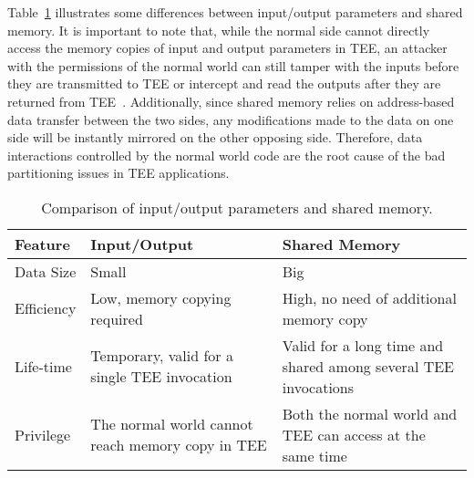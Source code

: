 Table~\ref{tbl:comp_params} illustrates some differences between input/output parameters and shared memory. It is important to note that, while the normal side cannot directly access the memory copies of input and output parameters in TEE, an attacker with the permissions of the normal world can still tamper with the inputs before they are transmitted to TEE or intercept and read the outputs after they are returned from TEE~\cite{9925569, 10477533}.
Additionally, since shared memory relies on address-based data transfer between the two sides, any modifications made to the data on one side will be instantly mirrored on the other opposing side.
Therefore, data interactions controlled by the normal world code are the root cause of the bad partitioning issues in TEE applications.

\begin{table}[t]
    \caption{Comparison of input/output parameters and shared memory.}
    \label{tbl:comp_params}
    \setlength{\tabcolsep}{3mm}
    \centering
	\begin{tabular}{lp{4.5cm}p{4.5cm}}
		\toprule
		\textbf{Feature} & \textbf{Input/Output} & \textbf{Shared Memory} \\
		\midrule
            Data Size & Small & Big  \\
            Efficiency & Low, memory copying required & High, no need of additional memory copy\\
            Life-time & Temporary, valid for a single TEE invocation & Valid for a long time and shared among several TEE invocations \\
            Privilege & The normal world cannot reach memory copy in TEE & Both the normal world and TEE can access at the same time \\
		\bottomrule
	\end{tabular}
\end{table}
